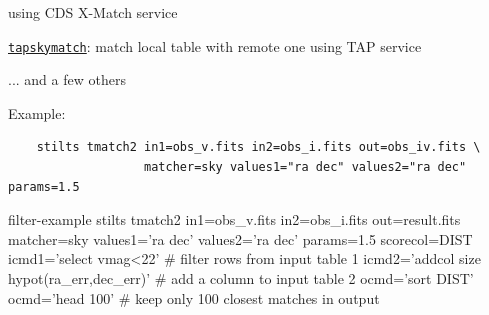 \documentclass[20pt,landscape]{foils}
\newcommand{\bhref}[2]{\href{#1}{{\color{blue}#2}}}
\begin{document}
\begin{list0}
\begin{list2}
\vspace*{-0.2cm}
                                     using CDS X-Match service
    \item[] \bhref{http://www.starlink.ac.uk/stilts/sun256/tapskymatch.html}
                  {\tt tapskymatch}: match local table with remote one
                                     using TAP service
\vspace*{-0.2cm}
    \item[] \hspace*{2em} ... and a few others
  \end{list2}
\vspace*{-0.2cm}
  \item Example: \\
\vspace*{-0.2cm}
        {\color{brown}\small
        \begin{verbatim}
    stilts tmatch2 in1=obs_v.fits in2=obs_i.fits out=obs_iv.fits \
                   matcher=sky values1="ra dec" values2="ra dec" params=1.5
        \end{verbatim}}
\end{list0}

\newcommand{\ca}[1]{{\color{darkgreen}#1}}
\newcommand{\cb}[1]{{\color{teal}#1}}
\newcommand{\cc}[1]{{\color{hotpink}#1}}
\newcommand{\ccomm}[1]{{\color{black}#1}}
\begin{SaveVerbatim}[commandchars=\\\{\}]{filter-example}
stilts tmatch2 \ca{in1=obs_v.fits} \cb{in2=obs_i.fits} \cc{out=result.fits}
               matcher=sky values1='ra dec' values2='ra dec' params=1.5
               scorecol=DIST
               \ca{icmd1='select vmag<22'}                    \ccomm{# filter rows from input table 1}
               \cb{icmd2='addcol size hypot(ra_err,dec_err)'} \ccomm{# add a column to input table 2}
               \cc{ocmd='sort DIST' ocmd='head 100'}          \ccomm{# keep only 100 closest matches in output}
\end{SaveVerbatim}

\end{document}
